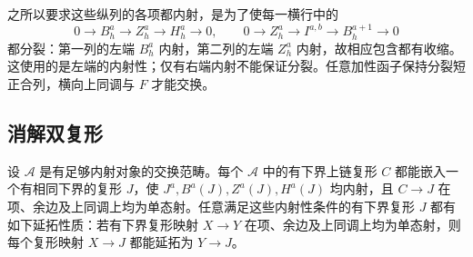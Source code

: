 之所以要求这些纵列的各项都内射，是为了使每一横行中的
\[
	0\to B_h^a\to Z_h^a\to H_h^a\to0, \qquad 0\to Z_h^a\to I^{a,b}\to B_h^{a+1}\to0
\]
都分裂：第一列的左端 \(B_h^a\) 内射，第二列的左端 \(Z_h^a\) 内射，故相应包含都有收缩。这使用的是左端的内射性；仅有右端内射不能保证分裂。任意加性函子保持分裂短正合列，横向上同调与 \(F\) 才能交换。

\subsection{消解双复形}
\label{b4:subsec:1502:02}

\begin{lemma}\label{b4:lem:ce-injective-rows}
	设 \(\mathcal A\) 是有足够内射对象的交换范畴。每个 \(\mathcal A\) 中的有下界上链复形 \(C\) 都能嵌入一个有相同下界的复形 \(J\)，使 \(J^a,B^a(J),Z^a(J),H^a(J)\) 均内射，且 \(C\to J\) 在项、余边及上同调上均为单态射。任意满足这些内射性条件的有下界复形 \(J\) 都有如下延拓性质：若有下界复形映射 \(X\to Y\) 在项、余边及上同调上均为单态射，则每个复形映射 \(X\to J\) 都能延拓为 \(Y\to J\)。
\end{lemma}
